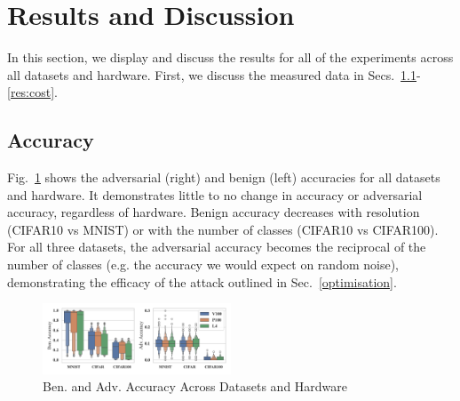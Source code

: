 \documentclass[conference]{IEEEtran}
\begin{document}
\section{Results and Discussion}
\label{results}

In this section, we display and discuss the results for all of the experiments across all datasets and hardware. First, we discuss the measured data in Secs.~\ref{res:acc}-\ref{res:cost}. 

\subsection{Accuracy}
\label{res:acc}
Fig.~\ref{fig:acc} shows the adversarial (right) and benign (left) accuracies for all datasets and hardware. It demonstrates little to no change in accuracy or adversarial accuracy, regardless of hardware. Benign accuracy decreases with resolution (CIFAR10 vs MNIST) or with the number of classes (CIFAR10 vs CIFAR100). For all three datasets, the adversarial accuracy becomes the reciprocal of the number of classes (e.g. the accuracy we would expect on random noise), demonstrating the efficacy of the attack outlined in Sec.~\ref{optimisation}.

\begin{figure}[h!]
    \centering
    \includegraphics[width=0.5\textwidth,trim={30pt 0 10pt 0},clip]{plots/combined/acc.pdf}
    \caption{Ben. and Adv. Accuracy Across Datasets and Hardware}
    \label{fig:acc}
\end{figure}
\end{document}
